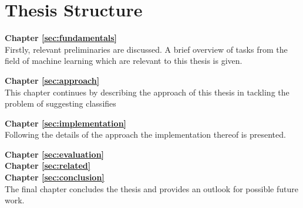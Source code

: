 \section{Thesis Structure}
\label{sec:intro:structure}

\textbf{Chapter \ref{sec:fundamentals}} \\[0.2em]
Firstly, relevant preliminaries are discussed. A brief overview of tasks from the field of machine learning which are relevant to this thesis is given.

\textbf{Chapter \ref{sec:approach}} \\[0.2em]
This chapter continues by describing the approach of this thesis in tackling the problem of suggesting classifies

\textbf{Chapter \ref{sec:implementation}} \\[0.2em]
Following the details of the approach the implementation thereof is presented.

\textbf{Chapter \ref{sec:evaluation}} \\[0.2em]

\textbf{Chapter \ref{sec:related}} \\[0.2em]


\textbf{Chapter \ref{sec:conclusion}} \\[0.2em]
The final chapter concludes the thesis and provides an outlook for possible future work.

